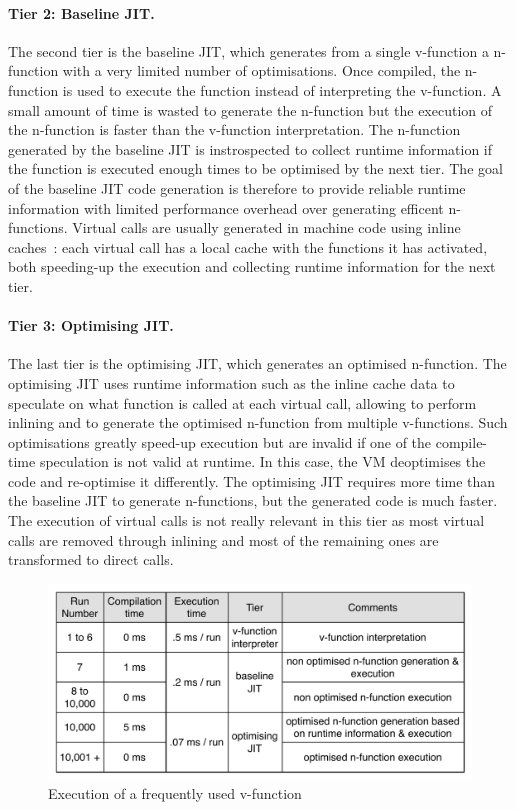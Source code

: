 \documentclass[a4paper,12pt,twoside]{../includes/ThesisStyle}
\begin{document}
\paragraph{Tier 2: Baseline JIT. } The second tier is the baseline JIT, which generates from a single v-function a n-function with a very limited number of optimisations. Once compiled, the n-function is used to execute the function instead of interpreting the v-function. A small amount of time is wasted to generate the n-function but the execution of the n-function is faster than the v-function interpretation. The n-function generated by the baseline JIT is instrospected to collect runtime information if the function is executed enough times to be optimised by the next tier. The goal of the baseline JIT code generation is therefore to provide reliable runtime information with limited performance overhead over generating efficent n-functions. Virtual calls are usually generated in machine code using inline caches~\cite{Deut84a,Holz91a}: each virtual call has a local cache with the functions it has activated, both speeding-up the execution and collecting runtime information for the next tier.
\paragraph{Tier 3: Optimising JIT. } The last tier is the optimising JIT, which generates an optimised n-function. The optimising JIT uses runtime information such as the inline cache data to speculate on what function is called at each virtual call, allowing to perform inlining and to generate the optimised n-function from multiple v-functions. Such optimisations greatly speed-up execution but are invalid if one of the compile-time speculation is not valid at runtime. In this case, the VM deoptimises the code and re-optimise it differently. The optimising JIT requires more time than the baseline JIT to generate n-functions, but the generated code is much faster. The execution of virtual calls is not really relevant in this tier as most virtual calls are removed through inlining and most of the remaining ones are transformed to direct calls.

\vspace{0.5em}

\begin{figure}[h!]
    \begin{center}
        \includegraphics[width=0.95\linewidth]{TieredArchitecture}
        \caption{Execution of a frequently used v-function}
        \label{fig:TieredArchitecture}
    \end{center}
\end{figure}
\end{document}
